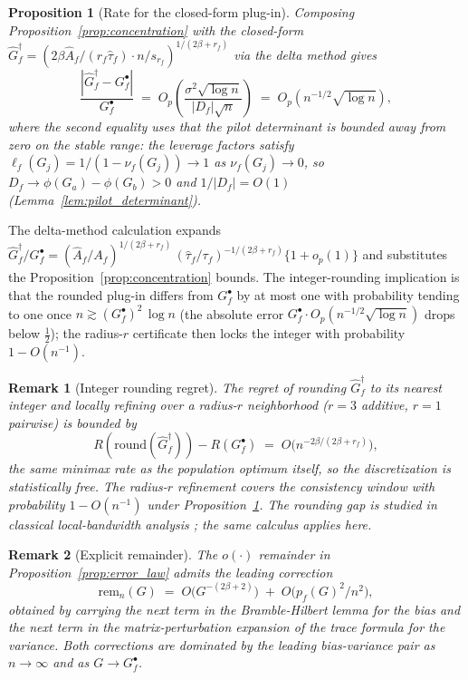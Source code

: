 \documentclass{article}
\newtheorem{proposition}{Proposition}
\newtheorem{remark}{Remark}
\begin{document}
\begin{proposition}[Rate for the closed-form plug-in]
\label{prop:plugin_rate}
Composing Proposition~\ref{prop:concentration} with the closed-form $\widehat G_f^\dagger = (2\beta \widehat A_f / (r_f \widehat\tau_f) \cdot n / s_{r_f})^{1/(2\beta + r_f)}$ via the delta method gives
\[
   \frac{|\widehat G_f^\dagger - G_f^\bullet|}{G_f^\bullet}
   \;=\; O_p\!\left(\frac{\sigma^2 \sqrt{\log n}}{|D_f|\sqrt{n}}\right)
   \;=\; O_p\!\left(n^{-1/2}\sqrt{\log n}\right) ,
\]
where the second equality uses that the pilot determinant is bounded away from zero on the stable range: the leverage factors satisfy $\ell_f(G_j) = 1/(1 - \nu_f(G_j)) \to 1$ as $\nu_f(G_j) \to 0$, so $D_f \to \phi(G_a) - \phi(G_b) > 0$ and $1/|D_f| = O(1)$ (Lemma~\ref{lem:pilot_determinant}).
\end{proposition}

The delta-method calculation expands $\widehat G_f^\dagger / G_f^\bullet = (\widehat A_f / A_f)^{1/(2\beta + r_f)}\,(\widehat\tau_f / \tau_f)^{-1/(2\beta + r_f)}\{1 + o_p(1)\}$ and substitutes the Proposition~\ref{prop:concentration} bounds. The integer-rounding implication is that the rounded plug-in differs from $G_f^\bullet$ by at most one with probability tending to one once $n \gtrsim (G_f^\bullet)^2\,\log n$ (the absolute error $G_f^\bullet \cdot O_p(n^{-1/2}\sqrt{\log n})$ drops below $\tfrac12$); the radius-$r$ certificate then locks the integer with probability $1 - O(n^{-1})$.

\begin{remark}[Integer rounding regret]
\label{rem:rounding_gap}
The regret of rounding $\widehat G_f^\dagger$ to its nearest integer and locally refining over a radius-$r$ neighborhood ($r = 3$ additive, $r = 1$ pairwise) is bounded by
\[
   R(\mathrm{round}(\widehat G_f^\dagger)) - R(G_f^\bullet)
   \;=\; O\!\bigl(n^{-2\beta / (2\beta + r_f)}\bigr) ,
\]
the same minimax rate as the population optimum itself, so the discretization is statistically free. The radius-$r$ refinement covers the consistency window with probability $1 - O(n^{-1})$ under Proposition~\ref{prop:plugin_rate}. The rounding gap is studied in classical local-bandwidth analysis \citep{hardle1988consistent}; the same calculus applies here.
\end{remark}

\begin{remark}[Explicit remainder]
\label{rem:remainder}
The $o(\cdot)$ remainder in Proposition~\ref{prop:error_law} admits the leading correction
\[
   \mathrm{rem}_n(G) \;=\; O\bigl(G^{-(2\beta + 2)}\bigr) \;+\; O\bigl(p_f(G)^2 / n^2\bigr) ,
\]
obtained by carrying the next term in the Bramble-Hilbert lemma for the bias and the next term in the matrix-perturbation expansion of the trace formula for the variance. Both corrections are dominated by the leading bias-variance pair as $n \to \infty$ and as $G \to G_f^\bullet$.
\end{remark}
\end{document}
